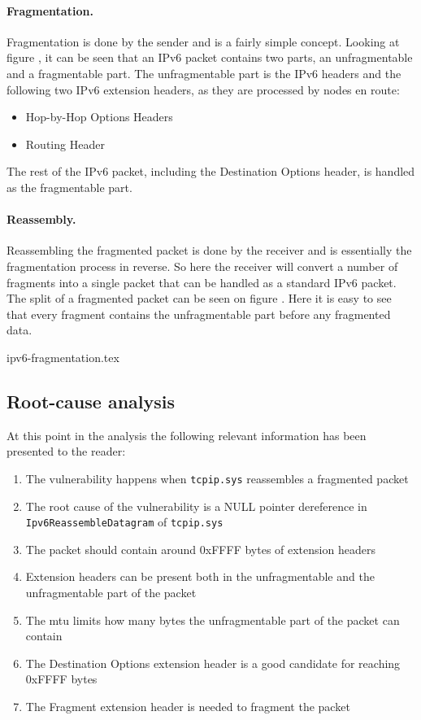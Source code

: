\documentclass{report}
\begin{document}
\paragraph{Fragmentation.} Fragmentation is done by the sender and is a fairly simple concept. Looking at figure , it can be seen that an IPv6 packet contains two parts, an unfragmentable and a fragmentable part. The unfragmentable part is the IPv6 headers and the following two IPv6 extension headers, as they are processed by nodes en route:

\begin{itemize}
    \item Hop-by-Hop Options Headers
    \item Routing Header
\end{itemize}

The rest of the IPv6 packet, including the Destination Options header, is handled as the fragmentable part.

\paragraph{Reassembly.} Reassembling the fragmented packet is done by the receiver and is essentially the fragmentation process in reverse. So here the receiver will convert a number of fragments into a single packet that can be handled as a standard IPv6 packet. The split of a fragmented packet can be seen on figure . Here it is easy to see that every fragment contains the unfragmentable part before any fragmented data.

{ipv6-fragmentation.tex}

\subsection{Root-cause analysis}
\label{sec:CVE-2021-24086:root-cause}
At this point in the analysis the following relevant information has been presented to the reader:
\begin{enumerate}
    \item The vulnerability happens when \texttt{tcpip.sys} reassembles a fragmented packet
    \item The root cause of the vulnerability is a NULL pointer dereference in \texttt{Ipv6ReassembleDatagram} of \texttt{tcpip.sys}
    \item The packet should contain around 0xFFFF bytes of extension headers
    \item Extension headers can be present both in the unfragmentable and the unfragmentable part of the packet
    \item The \gls{mtu} limits how many bytes the unfragmentable part of the packet can contain
    \item The Destination Options extension header is a good candidate for reaching 0xFFFF bytes
    \item The Fragment extension header is needed to fragment the packet
\end{enumerate}
\end{document}
